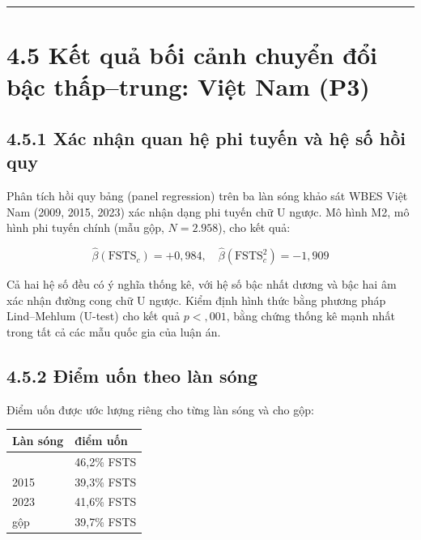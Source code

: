 \documentclass[
  a4paper,
  13pt]{extreport}
\begin{document}
\begin{center}\rule{0.5\linewidth}{0.5pt}\end{center}

\hypertarget{kux1ebft-quux1ea3-bux1ed1i-cux1ea3nh-chuyux1ec3n-ux111ux1ed5i-bux1eadc-thux1ea5ptrung-viux1ec7t-nam-p3}{%
\section{4.5 Kết quả bối cảnh chuyển đổi bậc thấp--trung: Việt Nam
(P3)}\label{kux1ebft-quux1ea3-bux1ed1i-cux1ea3nh-chuyux1ec3n-ux111ux1ed5i-bux1eadc-thux1ea5ptrung-viux1ec7t-nam-p3}}

\hypertarget{xuxe1c-nhux1eadn-quan-hux1ec7-phi-tuyux1ebfn-vuxe0-hux1ec7-sux1ed1-hux1ed3i-quy}{%
\subsection{4.5.1 Xác nhận quan hệ phi tuyến và hệ số hồi
quy}\label{xuxe1c-nhux1eadn-quan-hux1ec7-phi-tuyux1ebfn-vuxe0-hux1ec7-sux1ed1-hux1ed3i-quy}}

Phân tích hồi quy bảng (panel regression) trên ba làn sóng khảo sát WBES
Việt Nam (2009, 2015, 2023) xác nhận dạng phi tuyến chữ U ngược. Mô hình
M2, mô hình phi tuyến chính (mẫu gộp, \(N = 2.958\)), cho kết quả:

\[\hat{\beta}(\text{FSTS}_c) = +0{,}984, \quad \hat{\beta}(\text{FSTS}_c^2) = -1{,}909\]

Cả hai hệ số đều có ý nghĩa thống kê, với hệ số bậc nhất dương và bậc
hai âm xác nhận đường cong chữ U ngược. Kiểm định hình thức bằng phương
pháp Lind--Mehlum (U-test) cho kết quả \(p < {,}001\), bằng chứng thống
kê mạnh nhất trong tất cả các mẫu quốc gia của luận án.

\hypertarget{ux111iux1ec3m-uux1ed1n-theo-luxe0n-suxf3ng}{%
\subsection{4.5.2 Điểm uốn theo làn
sóng}\label{ux111iux1ec3m-uux1ed1n-theo-luxe0n-suxf3ng}}

Điểm uốn được ước lượng riêng cho từng làn sóng và cho gộp:

\begin{longtable}[]{@{}ll@{}}
\toprule\noalign{}
Làn sóng & điểm uốn \\
\midrule\noalign{}
\endhead
\bottomrule\noalign{}
\endlastfoot
2009 & 46,2\% FSTS \\
2015 & 39,3\% FSTS \\
2023 & 41,6\% FSTS \\
gộp & 39,7\% FSTS \\
\end{longtable}
\end{document}
